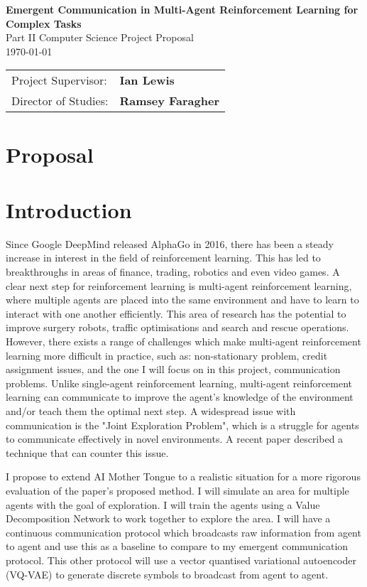 \documentclass[20pt]{article}
\begin{document}
\begin{center}
  \Huge
  \textbf{Emergent Communication in Multi-Agent Reinforcement Learning for Complex Tasks} \\[4mm]
  \Large
  Part II Computer Science Project Proposal \\[2mm]
  \today \\[8mm]
\end{center}

{\large
\begin{tabular}{ll}
  Project Supervisor:  & \bf Ian Lewis                \\
  Director of Studies: & \bf Ramsey Faragher                   \\
\end{tabular}
}

\section*{\fontsize{30}{36}\selectfont Proposal}


\section{Introduction}

\large
Since Google DeepMind released AlphaGo in 2016, there has been a steady increase in interest in the field of reinforcement learning. This has led to breakthroughs in areas of finance, trading, robotics and even video games. A clear next step for reinforcement learning is multi-agent reinforcement learning, where multiple agents are placed into the same environment and have to learn to interact with one another efficiently. This area of research has the potential to improve surgery robots, traffic optimisations and search and rescue operations. However, there exists a range of challenges which make multi-agent reinforcement learning more difficult in practice, such as: non-stationary problem, credit assignment issues, and the one I will focus on in this project, communication problems. Unlike single-agent reinforcement learning, multi-agent reinforcement learning can communicate to improve the agent's knowledge of the environment and/or teach them the optimal next step. A widespread issue with communication is the "Joint Exploration Problem", which is a struggle for agents to communicate effectively in novel environments. A recent paper\cite{AIMotherTongue} described a technique that can counter this issue.

I propose to extend AI Mother Tongue to a realistic situation for a more rigorous evaluation of the paper's proposed method. I will simulate an area for multiple agents with the goal of exploration. I will train the agents using a Value Decomposition Network to work together to explore the area. I will have a continuous communication protocol which broadcasts raw information from agent to agent and use this as a baseline to compare to my emergent communication protocol. This other protocol will use a vector quantised variational autoencoder (VQ-VAE) to generate discrete symbols to broadcast from agent to agent.
\end{document}
